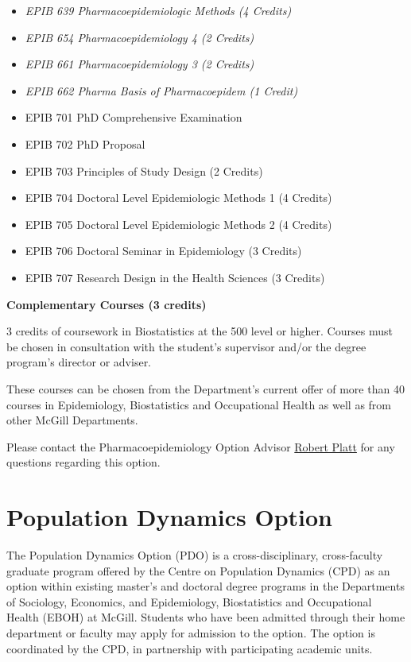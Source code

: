 \documentclass[
  openany]{book}
\providecommand{\tightlist}{%
  \setlength{\itemsep}{0pt}\setlength{\parskip}{0pt}}
\begin{document}
\begin{itemize}
\tightlist
\item
  \emph{EPIB 639 Pharmacoepidemiologic Methods (4 Credits)}
\item
  \emph{EPIB 654 Pharmacoepidemiology 4 (2 Credits)}
\item
  \emph{EPIB 661 Pharmacoepidemiology 3 (2 Credits)}
\item
  \emph{EPIB 662 Pharma Basis of Pharmacoepidem (1 Credit)}
\item
  EPIB 701 PhD Comprehensive Examination
\item
  EPIB 702 PhD Proposal
\item
  EPIB 703 Principles of Study Design (2 Credits)
\item
  EPIB 704 Doctoral Level Epidemiologic Methods 1 (4 Credits)
\item
  EPIB 705 Doctoral Level Epidemiologic Methods 2 (4 Credits)
\item
  EPIB 706 Doctoral Seminar in Epidemiology (3 Credits)
\item
  EPIB 707 Research Design in the Health Sciences (3 Credits)
\end{itemize}

\textbf{Complementary Courses (3 credits)}

3 credits of coursework in Biostatistics at the 500 level or higher. Courses must be chosen in consultation with the student's supervisor and/or the degree program's director or adviser.

These courses can be chosen from the Department's current offer of more than 40 courses in Epidemiology, Biostatistics and Occupational Health as well as from other McGill Departments.

Please contact the Pharmacoepidemiology Option Advisor \href{mailto:robert.platt@mcgill.ca}{Robert Platt} for any questions regarding this option.

\hypertarget{population-dynamics-option}{%
\section{Population Dynamics Option}\label{population-dynamics-option}}

The Population Dynamics Option (PDO) is a cross-disciplinary, cross-faculty graduate program offered by the Centre on Population Dynamics (CPD) as an option within existing master's and doctoral degree programs in the Departments of Sociology, Economics, and Epidemiology, Biostatistics and Occupational Health (EBOH) at McGill. Students who have been admitted through their home department or faculty may apply for admission to the option. The option is coordinated by the CPD, in partnership with participating academic units.
\end{document}
